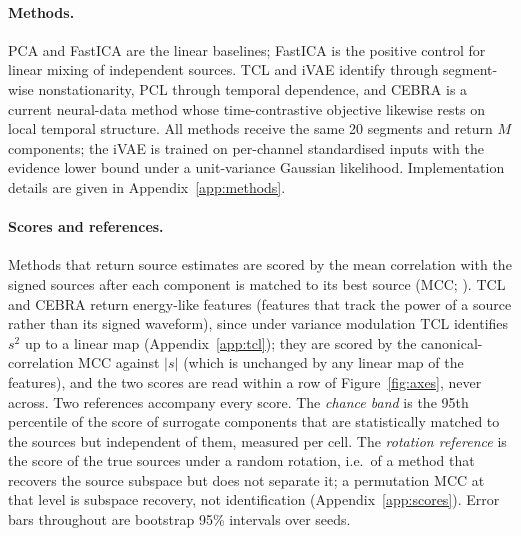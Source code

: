 \paragraph{Methods.}
PCA and FastICA \citep{hyvarinen1999fastica} are the linear baselines; FastICA is the positive control for linear mixing of independent sources.
TCL and iVAE identify through segment-wise nonstationarity, PCL through temporal dependence, and CEBRA \citep{schneider2023cebra} is a current neural-data method whose time-contrastive objective likewise rests on local temporal structure.
All methods receive the same 20 segments and return $M$ components; the iVAE is trained on per-channel standardised inputs with the evidence lower bound under a unit-variance Gaussian likelihood.
Implementation details are given in Appendix~\ref{app:methods}.

\paragraph{Scores and references.}
Methods that return source estimates are scored by the mean correlation with the signed sources after each component is matched to its best source (MCC; \citealp{hyvarinen2016tcl,khemakhem2020ivae}).
TCL and CEBRA return energy-like features (features that track the power of a source rather than its signed waveform), since under variance modulation TCL identifies $s^2$ up to a linear map (Appendix~\ref{app:tcl}); they are scored by the canonical-correlation MCC against $|s|$ (which is unchanged by any linear map of the features), and the two scores are read within a row of Figure~\ref{fig:axes}, never across.
Two references accompany every score.
The \textit{chance band} is the 95th percentile of the score of surrogate components that are statistically matched to the sources but independent of them, measured per cell.
The \textit{rotation reference} is the score of the true sources under a random rotation, i.e.\ of a method that recovers the source subspace but does not separate it; a permutation MCC at that level is subspace recovery, not identification (Appendix~\ref{app:scores}).
Error bars throughout are bootstrap 95\% intervals over seeds.
